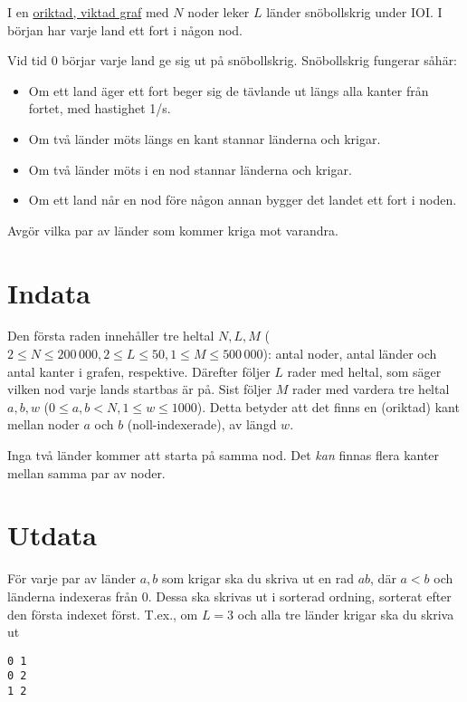 
I en \href{https://sv.wikipedia.org/wiki/Graf_(grafteori)}{oriktad, viktad graf}
med $N$ noder leker $L$ länder snöbollskrig under IOI.
I början har varje land ett fort i någon nod.

Vid tid $0$ börjar varje land ge sig ut på snöbollskrig. Snöbollskrig fungerar såhär:

\begin{itemize}
\item Om ett land äger ett fort beger sig de tävlande ut längs alla kanter från fortet, med hastighet 1/s.
\item Om två länder möts längs en kant stannar länderna och krigar.
\item Om två länder möts i en nod stannar länderna och krigar.
\item Om ett land når en nod före någon annan bygger det landet ett fort i noden.
\end{itemize}

Avgör vilka par av länder som kommer kriga mot varandra.

\section*{Indata}

Den första raden innehåller tre heltal $N,L,M$ ($2 \le N \le 200\,000, 2 \le L \le 50, 1 \le M \le 500\,000$):
antal noder, antal länder och antal kanter i grafen, respektive.
Därefter följer $L$ rader med heltal, som säger vilken nod varje lands startbas är på.
Sist följer $M$ rader med vardera tre heltal $a, b, w$ ($0 \le a,b < N, 1 \le w \le 1000$).
Detta betyder att det finns en (oriktad) kant mellan noder $a$ och $b$ (noll-indexerade), av längd $w$.

Inga två länder kommer att starta på samma nod. Det \emph{kan} finnas flera kanter mellan samma par av noder.

\section*{Utdata}

För varje par av länder $a, b$ som krigar ska du skriva ut en rad $a b$, där $a < b$ och länderna indexeras från $0$.
Dessa ska skrivas ut i sorterad ordning, sorterat efter den första indexet först.
T.ex., om $L = 3$ och alla tre länder krigar ska du skriva ut
\begin{lstlisting}
0 1
0 2
1 2
\end{lstlisting}

